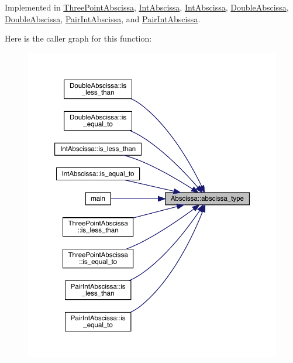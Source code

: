 Implemented in \mbox{\hyperlink{classThreePointAbscissa_a44344558fa4ee658be3344dfc3e69b17}{Three\+Point\+Abscissa}}, \mbox{\hyperlink{classIntAbscissa_a3d21dd199d2e7623429fadce5092ac88}{Int\+Abscissa}}, \mbox{\hyperlink{classIntAbscissa_a3d21dd199d2e7623429fadce5092ac88}{Int\+Abscissa}}, \mbox{\hyperlink{classDoubleAbscissa_ae69cb78334800cb8477daf2cefb4d67e}{Double\+Abscissa}}, \mbox{\hyperlink{classDoubleAbscissa_ae69cb78334800cb8477daf2cefb4d67e}{Double\+Abscissa}}, \mbox{\hyperlink{classPairIntAbscissa_a7b186cfb2c2d44289b12f0ade56ea948}{Pair\+Int\+Abscissa}}, and \mbox{\hyperlink{classPairIntAbscissa_a7b186cfb2c2d44289b12f0ade56ea948}{Pair\+Int\+Abscissa}}.

Here is the caller graph for this function\+:
\nopagebreak
\begin{figure}[H]
\begin{center}
\leavevmode
\includegraphics[width=350pt]{dd/db2/classAbscissa_af57ffcd07eee633bb2313bc7a932f3bb_icgraph}
\end{center}
\end{figure}
\mbox{\label{classAbscissa_af57ffcd07eee633bb2313bc7a932f3bb}} 
